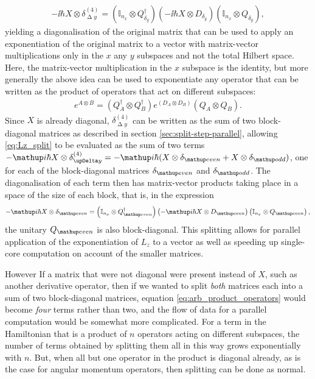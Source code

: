 \begin{enumerate}
    \begin{align}\label{eq:Lz_split}
        -\ii\hbar X \otimes \delta^{(4)}_{\upDelta y}
        = \left(\mathbb{I}_{n_x} \otimes Q_{\delta_y}^\dagger\right)
        \left(-\ii\hbar X \otimes  D_{\delta_y}\right)
        \left(\mathbb{I}_{n_x} \otimes Q_{\delta_y}\right),
    \end{align}
yielding a diagonalisation of the original matrix that can be used to apply an exponentiation of the original matrix to a vector with matrix-vector multiplications only in the $x$ any $y$ subspaces and not the total Hilbert space. Here, the matrix-vector multiplication in the $x$ subspace is the identity, but more generally the above idea can be used to exponentiate any operator that can be written as the product of operators that act on different subspaces:
\begin{align}\label{eq:arb_product_operators}
e^{A \otimes B} =
\left(Q^\dagger_A \otimes Q^\dagger_B\right)
e^{\left(D_A \otimes D_B\right)}
\left(Q_A \otimes Q_B\right).
\end{align}
Since $X$ is already diagonal, $\delta^{(4)}_{\upDelta y}$ can be written as the sum of two block-diagonal matrices as described in section \ref{sec:split-step-parallel}, allowing \eqref{eq:Lz_split} to be evaluated as the sum of two terms $-\ii\hbar X \otimes \delta^{(4)}_{\upDelta y} = -\ii\hbar (X \otimes \delta_\up{even} + X \otimes \delta_\up{odd})$, one for each of the block-diagonal matrices $\delta_\up{even}$ and $\delta_\up{odd}$. The diagonalisation of each term then has matrix-vector products taking place in a space of the size of each block, that is, in the expression
\begin{align}
-\ii\hbar X \otimes \delta_\up{even} = \left(\mathbb{I}_{n_x} \otimes Q_\up{even}^\dagger\right)
        \left(-\ii\hbar X \otimes  D_\up{even}\right)
        \left(\mathbb{I}_{n_x} \otimes Q_\up{even}\right),
\end{align}
the unitary $Q_\up{even}$ is also block-diagonal. This splitting allows for parallel application of the exponentiation of $L_z$ to a vector as well as speeding up single-core computation on account of the smaller matrices.

However If a matrix that were not diagonal were present instead of $X$, such as another derivative operator, then if we wanted to split \emph{both} matrices each into a sum of two block-diagonal matrices, equation \eqref{eq:arb_product_operators} would become \emph{four} terms rather than two, and the flow of data for a parallel computation would be somewhat more complicated. For a term in the Hamiltonian that is a product of $n$ operators acting on different subspaces, the number of terms obtained by splitting them all in this way grows exponentially with $n$. But, when all but one operator in the product is diagonal already, as is the case for angular momentum operators, then splitting can be done as normal.

\end{enumerate}

